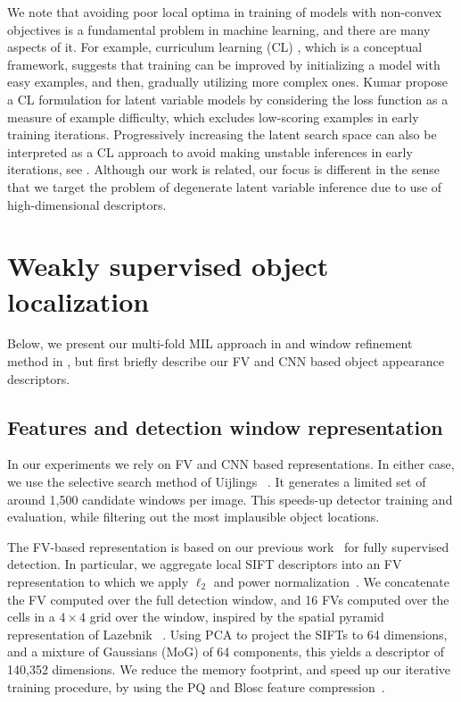 \documentclass[10pt,journal,cspaper,final,twocolumn,compsoc]{./IEEEtran}
\begin{document}
We note that avoiding poor local optima in training of
models with non-convex objectives is a
fundamental problem in machine learning, and there are many 
aspects of it.  For example,
curriculum learning (CL) \cite{bengio09icml}, which is a 
conceptual framework, suggests that training can be improved
by initializing a model with easy examples,
and then, gradually utilizing more complex ones.
Kumar \etal\cite{kumar10nips} propose a CL formulation 
for latent variable models
by considering the loss function as a measure
of example difficulty, which excludes low-scoring examples 
in early training iterations. 
Progressively increasing the latent search space
can also be interpreted as a CL approach
to avoid making unstable inferences in early iterations, see \eg\cite{russakovsky12eccv,bilen14ijcv}.
Although our work is related,  our focus is different in the sense that we target the problem of degenerate latent variable inference due to use of high-dimensional descriptors.


\section{Weakly supervised object localization}\label{sec:method}

Below, we present our multi-fold MIL approach in 
and window refinement method in , but
first briefly describe our FV and CNN based object
appearance descriptors. 

\subsection{Features and detection window representation}\label{sec:windows}

In our experiments we rely on FV and CNN based
representations.  In either case, we use the selective
search method of Uijlings \etal~\cite{uijlings13ijcv}. It
generates a limited set of around 1,500 candidate windows
per image.  This speeds-up detector training and
evaluation, while filtering out the most implausible
object locations.  

The FV-based representation is based on our previous
work~\cite{cinbis13iccv} for fully supervised detection.  In
particular, we aggregate local SIFT descriptors into an FV
representation to which we apply $\ell_2$ and power
normalization~\cite{sanchez13ijcv}. We concatenate the FV
computed over the full detection window, and  16 FVs
computed over the cells in a $4\times 4$ grid over the
window, inspired by the spatial pyramid representation of
Lazebnik \etal~\cite{lazebnik06cvpr}.  Using PCA to
project the SIFTs to 64 dimensions, and a mixture of
Gaussians (MoG) of 64 components, this yields a
descriptor of 140,352 dimensions. We reduce the memory
footprint, and speed up our iterative training procedure,
by using the PQ and Blosc feature
compression~\cite{alted10cse,jegou11pami2}.
\end{document}
